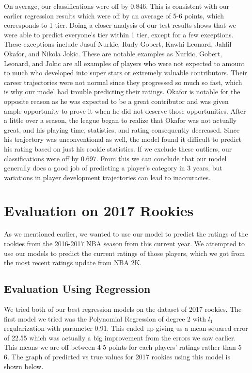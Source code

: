 \documentclass{article}
\begin{document}
On average, our classifications were off by 0.846. This is consistent with our earlier regression results which were off by an average of 5-6 points, which corresponds to 1 tier. Doing a closer analysis of our test results shows that we were able to predict everyone's tier within 1 tier, except for a few exceptions. These exceptions include Jusuf Nurkic, Rudy Gobert, Kawhi Leonard, Jahlil Okafor, and Nikola Jokic. These are notable examples as Nurkic, Gobert, Leonard, and Jokic are all examples of players who were not expected to amount to much who developed into super stars or extremely valuable contributors. Their career trajectories were not normal since they progressed so much so fast, which is why our model had trouble predicting their ratings. Okafor is notable for the opposite reason as he was expected to be a great contributor and was given ample opportunity to prove it when he did not deserve those opportunities. After a little over a season, the league began to realize that Okafor was not actually great, and his playing time, statistics, and rating consequently decreased. Since his trajectory was unconventional as well, the model found it difficult to predict his rating based on just his rookie statistics. If we exclude these outliers, our classifications were off by 0.697. From this we can conclude that our model generally does a good job of predicting a player's category in 3 years, but variations in player development trajectories can lead to inaccuracies.
\section{Evaluation on 2017 Rookies}
As we mentioned earlier, we wanted to use our model to predict the ratings of the rookies from the 2016-2017 NBA season from this current year. We attempted to use our models to predict the current ratings of those players, which we got from the most recent ratings update from NBA 2K. 
\subsection{Evaluation Using Regression}
We tried both of our best regression models on the dataset of 2017 rookies. The first model we tried was the Polynomial Regression of degree 2 with \(l_1\) regularization with parameter 0.91. This ended up giving us a mean-squared error of 22.55 which was actually a big improvement from the errors we saw earlier. This means we are off between 4-5 points for each players' ratings rather than 5-6. The graph of predicted vs true values for 2017 rookies using this model is shown below.
\end{document}
